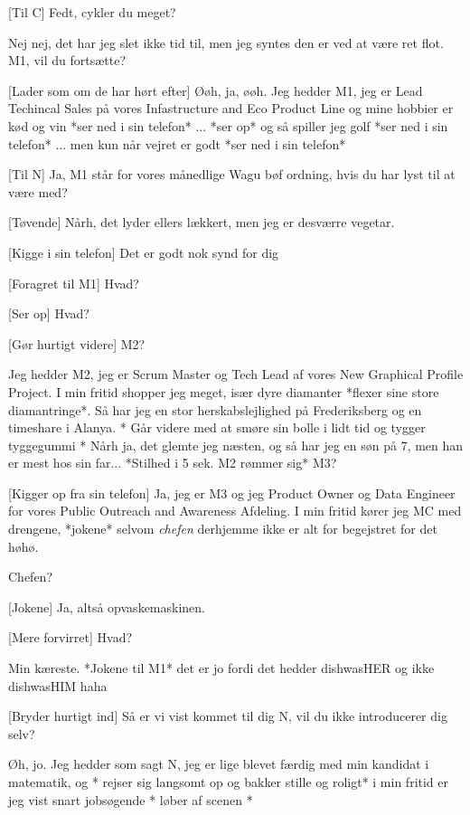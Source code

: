 \documentclass[a4paper,11pt]{article}
\begin{document}
\begin{sketch}
[Til C] Fedt, cykler du meget?

 Nej nej, det har jeg slet ikke tid til, men jeg syntes den er ved at være ret flot. M1, vil du fortsætte?


[Lader som om de har hørt efter] Øøh, ja, øøh. Jeg hedder M1, jeg er Lead Techincal Sales på vores Infastructure and Eco Product Line og mine hobbier er kød og vin *ser ned i sin telefon* ... *ser op* og så spiller jeg golf *ser ned i sin telefon* ... men kun når vejret er godt *ser ned i sin telefon* 

[Til N] Ja, M1 står for vores månedlige Wagu bøf ordning, hvis du har lyst til at være med? 

[Tøvende] Nårh, det lyder ellers lækkert, men jeg er desværre vegetar.

[Kigge i sin telefon] Det er godt nok synd for dig

[Foragret til M1] Hvad?

[Ser op] Hvad?

[Gør hurtigt videre] M2?

 Jeg hedder M2, jeg er Scrum Master og Tech Lead af vores New Graphical Profile Project. I min fritid shopper jeg meget, især dyre diamanter *flexer sine store diamantringe*. Så har jeg en stor herskabslejlighed på Frederiksberg og en timeshare i Alanya. * Går videre med at smøre sin bolle i lidt tid og tygger tyggegummi * Nårh ja, det glemte jeg næsten, og så har jeg en søn på 7, men han er mest hos sin far... *Stilhed i 5 sek. M2 rømmer sig* M3?

[Kigger op fra sin telefon] Ja, jeg er M3 og jeg Product Owner og Data Engineer for vores Public Outreach and Awareness Afdeling. I min fritid kører jeg MC med drengene, *jokene* selvom \textit{chefen} derhjemme ikke er alt for begejstret for det høhø. 

 Chefen?

[Jokene] Ja, altså opvaskemaskinen.

[Mere forvirret] Hvad?

 Min kæreste. *Jokene til M1* det er jo fordi det hedder dishwasHER og ikke dishwasHIM haha


[Bryder hurtigt ind] Så er vi vist kommet til dig N, vil du ikke introducerer dig selv?

 Øh, jo. Jeg hedder som sagt N, jeg er lige blevet færdig med min kandidat i matematik, og * rejser sig langsomt op og bakker stille og roligt* i min fritid er jeg vist snart jobsøgende * løber af scenen *


\end{sketch}
\end{document}
